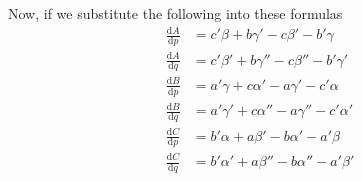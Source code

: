 Now, if we substitute the following into these formulas
\[
\begin{aligned}
\frac{\mathrm{d}A}{\mathrm{d}p}&=c'\beta+b\gamma'-c\beta'-b'\gamma\\
\frac{\mathrm{d}A}{\mathrm{d}q}&=c'\beta'+b\gamma''-c\beta''-b'\gamma'\\
\frac{\mathrm{d}B}{\mathrm{d}p}&=a'\gamma+c\alpha'-a\gamma'-c'\alpha\\
\frac{\mathrm{d}B}{\mathrm{d}q}&=a'\gamma'+c\alpha''-a\gamma''-c'\alpha'\\
\frac{\mathrm{d}C}{\mathrm{d}p}&=b'\alpha+a\beta'-b\alpha'-a'\beta\\
\frac{\mathrm{d}C}{\mathrm{d}q}&=b'\alpha'+a\beta''-b\alpha''-a'\beta'
\end{aligned}
\]
